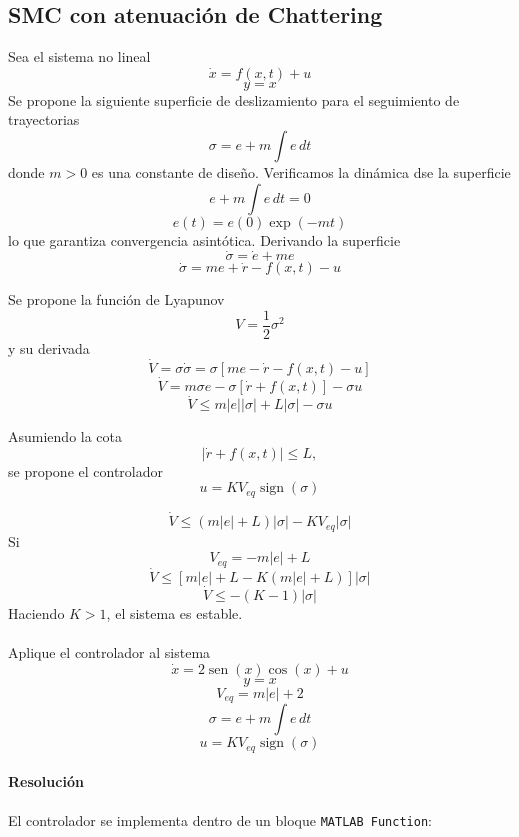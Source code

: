 \clearpage
\begin{flushright}
\end{flushright}

\subsection{SMC con atenuación de Chattering}

Sea el sistema no lineal
\[
  \dot{x}=f(x,t)+u
\]
\[
  y=x
\]
Se propone la siguiente superficie de deslizamiento para el seguimiento de
trayectorias
\[
  \sigma=e+m\int e\,dt
\]
donde $m>0$ es una constante de diseño. Verificamos la dinámica dse la
superficie
\[
  e+m\int e\,dt=0
\]
\[
  e(t)=e(0)\exp(-mt)
\]
lo que garantiza convergencia asintótica. Derivando la superficie
\[
  \dot{\sigma}=\dot{e}+me
\]
\[
  \dot{\sigma}=me+\dot{r}-f(x,t)-u
\]

Se propone la función de Lyapunov
\[
  V=\frac{1}{2}\sigma^2
\]
y su derivada
\[
  \dot{V}=\sigma\dot{\sigma}
  =\sigma\left[me-\dot{r}-f(x,t)-u\right]
\]
\[
  \dot{V}=m\sigma e-\sigma\left[\dot{r}+f(x,t)\right]-\sigma u
\]
\[
  \dot{V}\leq m\lvert e\rvert\lvert\sigma\rvert
  +L\lvert\sigma\rvert-\sigma u
\]

Asumiendo la cota
\[
  \left\lvert\dot{r}+f(x,t)\right\rvert\leq L,
\]
se propone el controlador
\[
  u=K V_{eq}\operatorname{sign}(\sigma)
\]

\[
  \dot{V}\leq(m\lvert e\rvert+L)\lvert\sigma\rvert
  -K V_{eq}\lvert\sigma\rvert
\]
Si
\[
  V_{eq}=-m\lvert e\rvert+L
\]
\[
  \dot{V}\leq
  \left[m\lvert e\rvert+L-K(m\lvert e\rvert+L)\right]
  \lvert\sigma\rvert
\]
\[
  \dot{V}\leq-(K-1)\lvert\sigma\rvert
\]
Haciendo $K>1$, el sistema es estable.

\paragraph{}
Aplique el controlador al sistema
\[
  \dot{x}=2\operatorname{sen}(x)\cos(x)+u
\]
\[
  y=x
\]
\[
  V_{eq}=m\lvert e\rvert+2
\]
\[
  \sigma=e+m\int e\,dt
\]
\[
  u=K V_{eq}\operatorname{sign}(\sigma)
\]

\paragraph{Resolución}

El controlador se implementa dentro de un bloque \texttt{MATLAB Function}:

